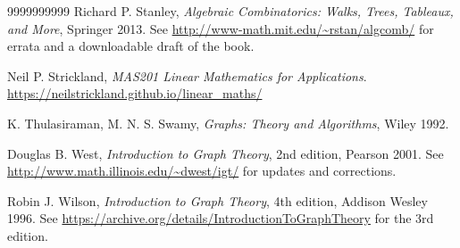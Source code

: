 \documentclass[numbers=enddot,12pt,final,onecolumn,notitlepage]{scrartcl}%
\theoremstyle{definition}
\begin{document}
\begin{thebibliography}{9999999999}
Richard P. Stanley,
\textit{Algebraic Combinatorics:
Walks, Trees, Tableaux, and More},
Springer 2013.
\newline See \url{http://www-math.mit.edu/~rstan/algcomb/} for errata
and a downloadable draft of the book.

Neil P. Strickland,
\textit{MAS201 Linear Mathematics for Applications}.
\newline \url{https://neilstrickland.github.io/linear_maths/}

K. Thulasiraman, M. N. S. Swamy,
\textit{Graphs: Theory and Algorithms},
Wiley 1992.

Douglas B. West,
\textit{Introduction to Graph Theory}, 2nd edition, Pearson 2001.
\newline See \url{http://www.math.illinois.edu/~dwest/igt/}
for updates and corrections.

Robin J. Wilson,
\textit{Introduction to Graph Theory}, 4th edition,
Addison Wesley 1996. \newline
See \url{https://archive.org/details/IntroductionToGraphTheory} for
the 3rd edition.

\end{thebibliography}
\end{document}
